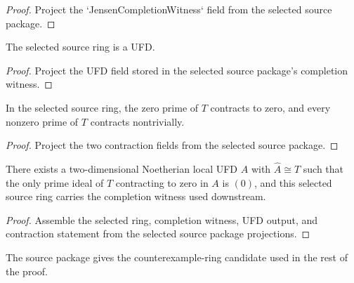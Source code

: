 \begin{proof}
  Project the `JensenCompletionWitness` field from the selected source package.
\end{proof}

\begin{lemma}
  \label{lem:jensen_selected_ring_ufd_source}
  The selected source ring is a UFD.
\end{lemma}

\begin{proof}
  Project the UFD field stored in the selected source package's completion
  witness.
\end{proof}

\begin{lemma}
  \label{lem:jensen_selected_ring_generic_fiber_source}
  In the selected source ring, the zero prime of \(T\) contracts to zero, and
  every nonzero prime of \(T\) contracts nontrivially.
\end{lemma}

\begin{proof}
  Project the two contraction fields from the selected source package.
\end{proof}

\begin{lemma}
  \label{lem:jensen_special_case_source}
  There exists a two-dimensional Noetherian local UFD \(A\) with
  \(\widehat A\cong T\) such that the only prime ideal of \(T\) contracting
  to zero in \(A\) is \((0)\), and this selected source ring carries the
  completion witness used downstream.
\end{lemma}

\begin{proof}
  Assemble the selected ring, completion witness, UFD output, and contraction
  statement from the selected source package projections.
\end{proof}

\begin{lemma}
  \label{lem:jensen_special_case}
  The source package gives the counterexample-ring candidate used in the rest of
  the proof.
\end{lemma}

